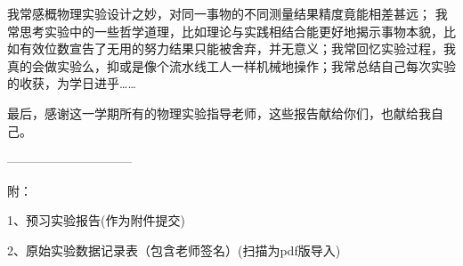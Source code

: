 \documentclass[11pt]{article}
\begin{document}
我常感概物理实验设计之妙，对同一事物的不同测量结果精度竟能相差甚远；
我常思考实验中的一些哲学道理，比如理论与实践相结合能更好地揭示事物本貌，比如有效位数宣告了无用的努力结果只能被舍弃，并无意义；我常回忆实验过程，我真的会做实验么，抑或是像个流水线工人一样机械地操作；我常总结自己每次实验的收获，为学日进乎……


    \hspace*{2cm} {\kaishu 最后，感谢这一学期所有的物理实验指导老师，这些报告献给你们，也献给我自己。}











——————————

附：

1、预习实验报告(作为附件提交)

2、原始实验数据记录表（包含老师签名）(扫描为pdf版导入)

\newpage


\end{document}
